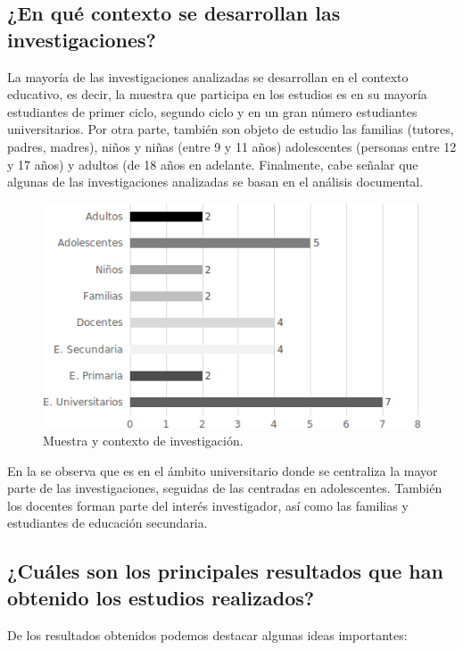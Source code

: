 \documentclass[spanish]{textolivre}
\begin{document}
\subsection{¿En qué contexto se desarrollan las investigaciones?}\label{sec-organizacao-latex}
La mayoría de las investigaciones analizadas se desarrollan en el contexto educativo, es decir, la muestra que participa en los estudios es en su mayoría estudiantes de primer ciclo, segundo ciclo y en un gran número estudiantes universitarios. Por otra parte, también son objeto de estudio las familias (tutores, padres, madres), niños y niñas (entre 9 y 11 años) adolescentes (personas entre 12 y 17 años) y adultos (de 18 años en adelante. Finalmente, cabe señalar que algunas de las investigaciones analizadas se basan en el análisis documental.

\begin{figure}[h!]
\centering
\begin{minipage}{0.65\textwidth}
\includegraphics[width=\textwidth]{Fig7.png}
\caption{Muestra y contexto de investigación.}
\label{fig7}
\end{minipage}
\end{figure}

En la  se observa que es en el ámbito universitario donde se centraliza la mayor parte de las investigaciones, seguidas de las centradas en adolescentes. También los docentes forman parte del interés investigador, así como las familias y estudiantes de educación secundaria.

\subsection{¿Cuáles son los principales resultados que han obtenido los estudios realizados?}\label{sec-titulo}
De los resultados obtenidos podemos destacar algunas ideas importantes:
\end{document}
